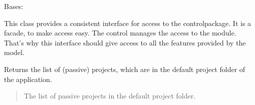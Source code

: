 \documentclass[letterpaper,10pt,english]{sphinxmanual}
\begin{document}
\begin{fulllineitems}
\label{\detokenize{apidoc/src.osm_configurator.control:src.osm_configurator.control.control_interface.IControl}}
\pysigstartsignatures
{}
\pysigstopsignatures
\sphinxAtStartPar
Bases: 

\sphinxAtStartPar
This class provides a consistent interface for access to the control\sphinxhyphen{}package. It is a facade, to make access easy.
The control manages the access to the module. That’s why this interface should give access to all the features provided by the model.

\begin{fulllineitems}
\label{\detokenize{apidoc/src.osm_configurator.control:src.osm_configurator.control.control_interface.IControl.get_list_of_passive_projects}}
\pysigstartsignatures
{}
\pysigstopsignatures
\sphinxAtStartPar
Returns the list of (passive) projects, which are in the default project folder of the application.
\begin{quote}\begin{description}
\sphinxAtStartPar
The list of passive projects in the default project folder.

\sphinxAtStartPar
{}

\end{description}\end{quote}

\end{fulllineitems}



\end{fulllineitems}
\end{document}
